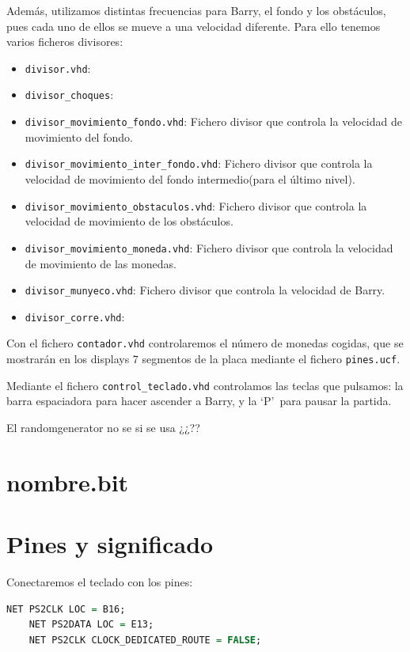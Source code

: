 \documentclass[11pt, a4paper, spanish, openright, twoside]{book}
\begin{document}
Además, utilizamos distintas frecuencias para Barry, el fondo y los obstáculos, pues cada uno de ellos se mueve a una velocidad diferente. Para ello tenemos varios ficheros divisores:
\begin{itemize}

	\item \texttt{divisor.vhd}: 
	\item \texttt{divisor\_choques}: 
	\item \texttt{divisor\_movimiento\_fondo.vhd}: Fichero divisor que controla la velocidad de movimiento del fondo.
	\item \texttt{divisor\_movimiento\_inter\_fondo.vhd}: Fichero divisor que controla la velocidad de movimiento del fondo intermedio(para el último nivel).
	\item \texttt{divisor\_movimiento\_obstaculos.vhd}: Fichero divisor que controla la velocidad de movimiento de los obstáculos.
	\item \texttt{divisor\_movimiento\_moneda.vhd}: Fichero divisor que controla la velocidad de movimiento de las monedas.
	\item \texttt{divisor\_munyeco.vhd}: Fichero divisor que controla la velocidad de Barry.
	\item \texttt{divisor\_corre.vhd}: 
	
\end{itemize}

Con el fichero \texttt{contador.vhd} controlaremos el número de monedas cogidas, que se mostrarán en los displays 7 segmentos de la placa mediante el fichero \texttt{pines.ucf}.

Mediante el fichero \texttt{control\_teclado.vhd} controlamos las teclas que pulsamos: la barra espaciadora para hacer ascender a Barry, y la `P'\ para pausar la partida.

El randomgenerator no se si se usa ¿¿??


\section{nombre.bit}


\section{Pines y significado}
Conectaremos el teclado con los pines:

\begin{lstlisting}[language=VHDL]
	NET PS2CLK LOC = B16;
	NET PS2DATA LOC = E13;
	NET PS2CLK CLOCK_DEDICATED_ROUTE = FALSE;
\end{lstlisting}
\end{document}
